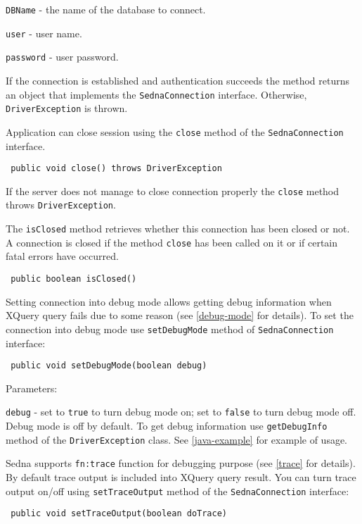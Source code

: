 \documentclass[a4paper,12pt]{article}
\begin{document}
\verb!DBName! - the name of the database to connect.

\verb!user! - user name.

\verb!password! - user password.

If the connection is established and authentication succeeds the method returns
an object that implements the \verb!SednaConnection! interface. Otherwise,
\verb!DriverException! is thrown.

Application can close session using the \verb!close! method of the
\verb!SednaConnection! interface.

\begin{verbatim}
 public void close() throws DriverException
\end{verbatim}

If the server does not manage to close connection properly the \verb!close!
method throws \verb!DriverException!.

The \verb!isClosed! method retrieves whether this connection has been closed or
not. A connection is closed if the method \verb!close! has been called on it or
if certain fatal errors have occurred.

\begin{verbatim}
 public boolean isClosed()
\end{verbatim}


Setting connection into debug mode allows getting debug information when XQuery
query fails due to some reason (see \ref{debug-mode} for details). To set the
connection into debug mode use \verb!setDebugMode! method of
\verb!SednaConnection! interface:

\begin{verbatim}
 public void setDebugMode(boolean debug)
\end{verbatim}

Parameters:

\verb!debug! - set to \verb!true! to turn debug mode on; set to \verb!false! to
turn debug mode off. Debug mode is off by default. To get debug information
use \verb!getDebugInfo! method of the \verb!DriverException! class. See
\ref{java-example} for example of usage.

Sedna supports \verb!fn:trace! function for debugging purpose (see
\ref{trace} for details). By default trace output is included into XQuery query
result. You can turn trace output on/off using \verb!setTraceOutput! method of
the \verb!SednaConnection! interface:

\begin{verbatim}
 public void setTraceOutput(boolean doTrace)
\end{verbatim}
\end{document}
